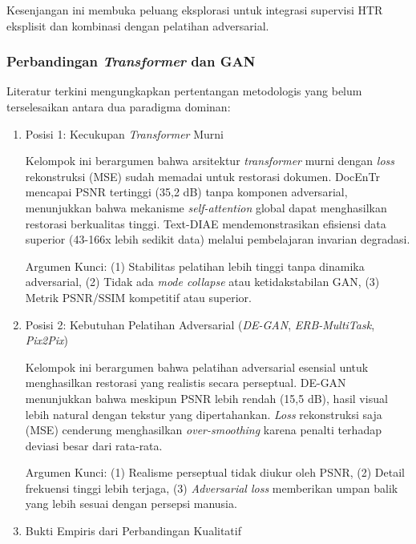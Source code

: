 \documentclass[12pt,a4paper]{article}
\begin{document}
Kesenjangan ini membuka peluang eksplorasi untuk integrasi supervisi HTR eksplisit dan kombinasi dengan pelatihan adversarial.

\subsubsection{Perbandingan \textit{Transformer} dan GAN}
\label{subsubsec:methodological-debate}
Literatur terkini mengungkapkan pertentangan metodologis yang belum terselesaikan antara dua paradigma dominan:

\begin{enumerate}[leftmargin=*, labelindent=0pt, itemsep=1ex, topsep=0pt]

\item Posisi 1: Kecukupan \textit{Transformer} Murni
\label{para:debat-posisi1}

Kelompok ini berargumen bahwa arsitektur \textit{transformer} murni dengan \textit{loss} rekonstruksi (MSE) sudah memadai untuk restorasi dokumen. DocEnTr mencapai PSNR tertinggi (35,2 dB) tanpa komponen adversarial, menunjukkan bahwa mekanisme \textit{self-attention} global dapat menghasilkan restorasi berkualitas tinggi. Text-DIAE mendemonstrasikan efisiensi data superior (43-166x lebih sedikit data) melalui pembelajaran invarian degradasi.

Argumen Kunci: (1) Stabilitas pelatihan lebih tinggi tanpa dinamika adversarial, (2) Tidak ada \textit{mode collapse} atau ketidakstabilan GAN, (3) Metrik PSNR/SSIM kompetitif atau superior.

\item Posisi 2: Kebutuhan Pelatihan Adversarial (\textit{DE-GAN}, \textit{ERB-MultiTask}, \textit{Pix2Pix})

Kelompok ini berargumen bahwa pelatihan adversarial esensial untuk menghasilkan restorasi yang realistis secara perseptual. DE-GAN menunjukkan bahwa meskipun PSNR lebih rendah (15,5 dB), hasil visual lebih natural dengan tekstur yang dipertahankan. \textit{Loss} rekonstruksi saja (MSE) cenderung menghasilkan \textit{over-smoothing} karena penalti terhadap deviasi besar dari rata-rata.

Argumen Kunci: (1) Realisme perseptual tidak diukur oleh PSNR, (2) Detail frekuensi tinggi lebih terjaga, (3) \textit{Adversarial loss} memberikan umpan balik yang lebih sesuai dengan persepsi manusia.

\item Bukti Empiris dari Perbandingan Kualitatif


\end{enumerate}
\end{document}
